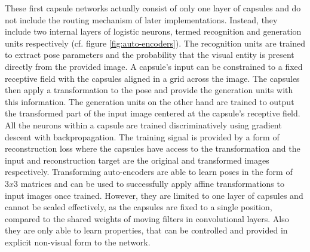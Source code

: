 These first capsule networks actually consist of only one layer of capsules and do not include the routing mechanism of later implementations. Instead, they include two internal layers of logistic neurons, termed recognition and generation units respectively (cf. figure \ref{fig:auto-encoders}). The recognition units are trained to extract pose parameters and the probability that the visual entity is present directly from the provided image. A capsule's input can be constrained to a fixed receptive field with the capsules aligned in a grid across the image. The capsules then apply a transformation to the pose and provide the generation units with this information. The generation units on the other hand are trained to output the transformed part of the input image centered at the capsule's receptive field. All the neurons within a capsule are trained discriminatively using gradient descent with backpropagation. The training signal is provided by a form of reconstruction loss where the capsules have access to the transformation and the input and reconstruction target are the original and transformed images respectively. Transforming auto-encoders are able to learn poses in the form of $3x3$ matrices and can be used to successfully apply affine transformations to input images once trained. However, they are limited to one layer of capsules and cannot be scaled effectively, as the capsules are fixed to a single position, compared to the shared weights of moving filters in convolutional layers. Also they are only able to learn properties, that can be controlled and provided in explicit non-visual form to the network.
